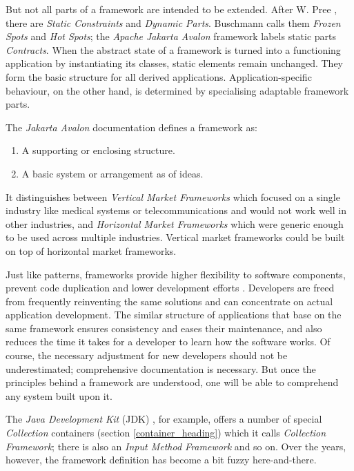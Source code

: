 But not all parts of a framework are intended to be extended. After W. Pree
\cite{pree}, there are \emph{Static Constraints} and \emph{Dynamic Parts}.
Buschmann \cite{buschmann} calls them \emph{Frozen Spots} and \emph{Hot Spots};
the \emph{Apache Jakarta Avalon} framework \cite{avalon} labels static parts
\emph{Contracts}. When the abstract state of a framework is turned into a
functioning application by instantiating its classes, static elements remain
unchanged. They form the basic structure for all derived applications.
Application-specific behaviour, on the other hand, is determined by
specialising adaptable framework parts.

The \emph{Jakarta Avalon} documentation \cite{avalon} defines a framework as:

\begin{enumerate}
    \item A supporting or enclosing structure.
    \item A basic system or arrangement as of ideas.
\end{enumerate}

It distinguishes between \emph{Vertical Market Frameworks} which focused on a
single industry like medical systems or telecommunications and would not work
well in other industries, and \emph{Horizontal Market Frameworks} which were
generic enough to be used across multiple industries. Vertical market frameworks
could be built on top of horizontal market frameworks.

Just like patterns, frameworks provide higher flexibility to software components,
prevent code duplication and lower development efforts \cite{pree}. Developers
are freed from frequently reinventing the same solutions and can concentrate on
actual application development. The similar structure of applications that base
on the same framework ensures consistency and eases their maintenance, and also
reduces the time it takes for a developer to learn how the software works. Of
course, the necessary adjustment for new developers should not be underestimated;
comprehensive documentation is necessary. But once the principles behind a
framework are understood, one will be able to comprehend any system built upon it.

The \emph{Java Development Kit} (JDK) \cite{java}, for example, offers a number of
special \emph{Collection} containers (section \ref{container_heading}) which it
calls \emph{Collection Framework}; there is also an \emph{Input Method Framework}
and so on. Over the years, however, the framework definition has become a bit
fuzzy here-and-there.

